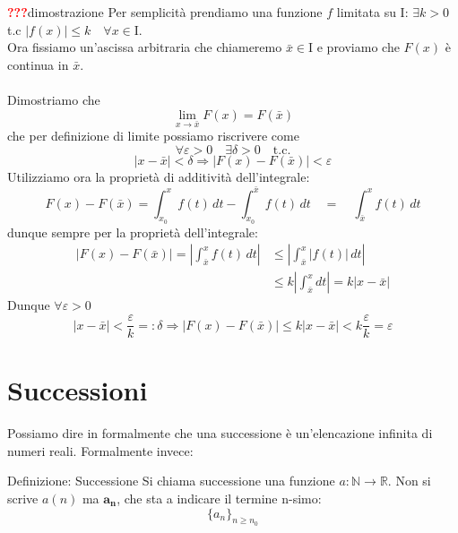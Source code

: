 \documentclass[x11names]{article}
\begin{document}
	\begin{es}{\textcolor{red}{\textbf{???}}dimostrazione}
		Per semplicità prendiamo una funzione $f$ limitata su I: $\exists k >0$ t.c $|f(x)| \leq k \quad \forall x \in \text{I}$.\\
		Ora fissiamo un'ascissa arbitraria che chiameremo $\bar{x} \in \text{I}$ e proviamo che $F(x)$ è continua in $\bar{x}$. \\ \\
		
		Dimostriamo che 
		\[
		\lim_{x \to \bar{x}}F(x) = F(\bar{x})
		\]
		che per definizione di limite possiamo riscrivere come
		\[
		\forall\varepsilon > 0 \quad \exists \delta > 0 \quad \text{t.c.} 
		\]
		\[
		|x-\bar{x}| < \delta \Longrightarrow |F(x) - F(\bar{x})| < \varepsilon
		\]
		Utilizziamo ora la proprietà di additività dell'integrale:
		\[
		F(x) - F(\bar{x}) = \int_{x_0}^{x}f(t) \,dt - \int_{x_0}^{\bar{x}}f(t) \,dt  \quad = \quad \int_{\bar{x}}^{x}f(t) \,dt
		\]
		dunque sempre per la proprietà dell'integrale:
		\begin{align*}
			|F(x) - F(\bar{x})| = \left|\int_{\bar{x}}^{x}f(t) \,dt\right| &\leq \left|\int_{\bar{x}}^{x}|f(t)| \,dt\right| \\
			&\leq k\left|\int_{\bar{x}}^{x}dt\right| = k |x - \bar{x}|
		\end{align*}
		Dunque $\forall \varepsilon > 0$
		\[
		|x-\bar{x}| < \frac{\varepsilon}{k} =: \delta \Longrightarrow |F(x) - F(\bar{x})| \leq k|x-\bar{x}| < k \frac{\varepsilon}{k} = \varepsilon
		\]
		
	\end{es}
	
	\newpage
	\section{Successioni}
	Possiamo dire in formalmente che una successione è un'elencazione infinita di numeri reali. Formalmente invece:
		\begin{center}
		\colorbox{myblue}{\begin{minipage}{5.75in}
				\begin{blues}{Definizione: Successione}
					Si chiama successione una funzione $a: \mathbb{N}\to \mathbb{R}$. Non si scrive $a(n)$ ma $\mathbf{a_n}$, che sta a indicare il termine n-simo:
					\[
					\{a_n\}_{n\geq n_0}
					\]
				\end{blues}
		\end{minipage}}       
	\end{center}
	
\end{document}
